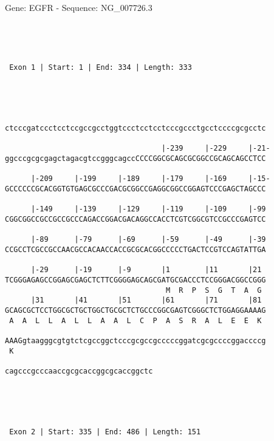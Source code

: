 \documentclass{article}
\begin{document}
\begin{center}
\begin{large}
 Gene: EGFR - Sequence: NG\_007726.3
\end{large}
\end{center}
 \begin{Verbatim}




 Exon 1 | Start: 1 | End: 334 | Length: 333 




                                                            
ctcccgatccctcctccgccgcctggtccctcctcctcccgccctgcctccccgcgcctc
                                                            
                                    |-239     |-229     |-21-
ggcccgcgcgagctagacgtccgggcagccCCCCGGCGCAGCGCGGCCGCAGCAGCCTCC
                                                            
      |-209     |-199     |-189     |-179     |-169     |-15-
GCCCCCCGCACGGTGTGAGCGCCCGACGCGGCCGAGGCGGCCGGAGTCCCGAGCTAGCCC
                                                            
      |-149     |-139     |-129     |-119     |-109     |-99
CGGCGGCCGCCGCCGCCCAGACCGGACGACAGGCCACCTCGTCGGCGTCCGCCCGAGTCC
                                                            
      |-89      |-79      |-69      |-59      |-49      |-39
CCGCCTCGCCGCCAACGCCACAACCACCGCGCACGGCCCCCTGACTCCGTCCAGTATTGA
                                                            
      |-29      |-19      |-9       |1        |11       |21 
TCGGGAGAGCCGGAGCGAGCTCTTCGGGGAGCAGCGATGCGACCCTCCGGGACGGCCGGG
                                     M  R  P  S  G  T  A  G 
      |31       |41       |51       |61       |71       |81 
GCAGCGCTCCTGGCGCTGCTGGCTGCGCTCTGCCCGGCGAGTCGGGCTCTGGAGGAAAAG
 A  A  L  L  A  L  L  A  A  L  C  P  A  S  R  A  L  E  E  K 
                                                            
AAAGgtaagggcgtgtctcgccggctcccgcgccgcccccggatcgcgccccggaccccg
 K                                                          
                                  
cagcccgcccaaccgcgcaccggcgcaccggctc
                                  




 Exon 2 | Start: 335 | End: 486 | Length: 151 





\end{Verbatim}
\end{document}
